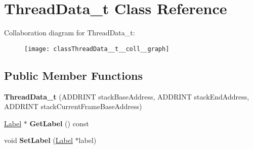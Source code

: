 \hypertarget{classThreadData__t}{\section{Thread\-Data\-\_\-t Class Reference}
\label{classThreadData__t}
}


Collaboration diagram for Thread\-Data\-\_\-t\-:
\nopagebreak
\begin{figure}[H]
\begin{center}
\leavevmode
\texttt{[image: classThreadData\_\_t\_\_coll\_\_graph]}
\end{center}
\end{figure}
\subsection*{Public Member Functions}
\begin{DoxyCompactItemize}
\item 
\hypertarget{classThreadData__t_a22203941b96bbe6cea34b4cc4a6070ea}{{\bfseries Thread\-Data\-\_\-t} (A\-D\-D\-R\-I\-N\-T stack\-Base\-Address, A\-D\-D\-R\-I\-N\-T stack\-End\-Address, A\-D\-D\-R\-I\-N\-T stack\-Current\-Frame\-Base\-Address)}\label{classThreadData__t_a22203941b96bbe6cea34b4cc4a6070ea}

\item 
\hypertarget{classThreadData__t_a1d3a20be3e399d4dfa71bf0f1269b44d}{\hyperlink{classLabel}{Label} $\ast$ {\bfseries Get\-Label} () const }\label{classThreadData__t_a1d3a20be3e399d4dfa71bf0f1269b44d}

\item 
\hypertarget{classThreadData__t_a7dce48f6655568d46cd5ba63d476cc4c}{void {\bfseries Set\-Label} (\hyperlink{classLabel}{Label} $\ast$label)}\label{classThreadData__t_a7dce48f6655568d46cd5ba63d476cc4c}

\end{DoxyCompactItemize}
